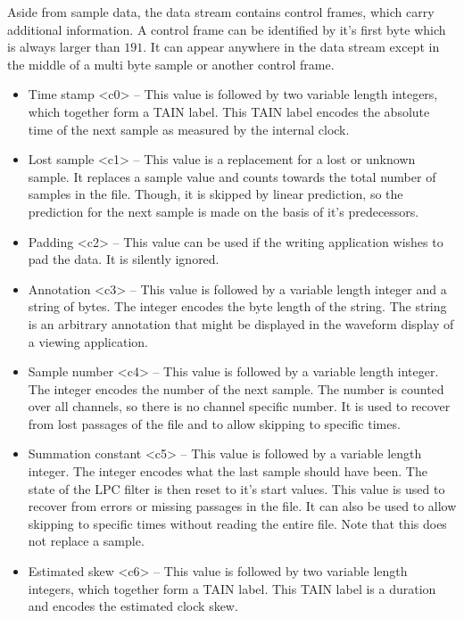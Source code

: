 \documentclass[DIV=10]{scrartcl}
\begin{document}
Aside from sample data, the data stream contains control frames, which carry additional information.
A control frame can be identified by it’s first byte which is always larger than \(191\).
It can appear anywhere in the data stream except in the middle of a multi byte sample or another control frame.

\begin{itemize}
  \item Time stamp <c0> – This value is followed by two variable length integers, which together form a TAIN label.
  This TAIN label encodes the absolute time of the next sample as measured by the internal clock.
  \item Lost sample <c1> – This value is a replacement for a lost or unknown sample.
  It replaces a sample value and counts towards the total number of samples in the file.
  Though, it is skipped by linear prediction, so the prediction for the next sample is made on the basis of it’s predecessors.
  \item Padding <c2> – This value can be used if the writing application wishes to pad the data.
  It is silently ignored.
  \item Annotation <c3> – This value is followed by a variable length integer and a string of bytes.
  The integer encodes the byte length of the string.
  The string is an arbitrary annotation that might be displayed in the waveform display of a viewing application.
  \item Sample number <c4> – This value is followed by a variable length integer.
  The integer encodes the number of the next sample.
  The number is counted over all channels, so there is no channel specific number.
  It is used to recover from lost passages of the file and to allow skipping to specific times.
  \item Summation constant <c5> – This value is followed by a variable length integer.
  The integer encodes what the last sample should have been.
  The state of the LPC filter is then reset to it’s start values.
  This value is used to recover from errors or missing passages in the file.
  It can also be used to allow skipping to specific times without reading the entire file.
  Note that this does not replace a sample.
  \item Estimated skew <c6> – This value is followed by two variable length integers, which together form a TAIN label.
  This TAIN label is a duration and encodes the estimated clock skew.
\end{itemize}
\end{document}
